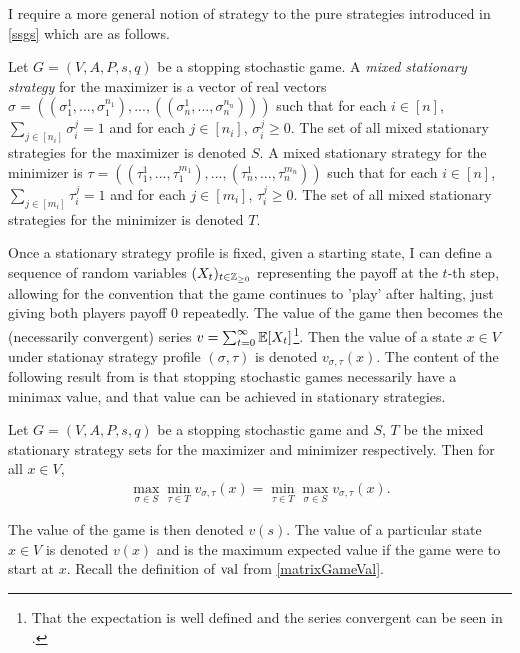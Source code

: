 I require a more general notion of strategy to the pure strategies introduced in \cref{ssgs} which
are as follows.
\begin{definition}
  Let $G = (V, A, P, s, q)$ be a stopping stochastic game. A \emph{mixed stationary strategy}
  for the maximizer is a vector of real vectors 
  $\sigma = ((\sigma_1^{1}, ..., \sigma_1^{n_1}), ..., ((\sigma_n^{1}, ..., \sigma_n^{n_n})))$ such
  that for each $i \in [n]$, $\sum_{j \in [n_i]} \sigma_i^j = 1$ and for each $j \in [n_i]$, $\sigma_i^j \geq 0$.
  The set of all mixed stationary strategies for the maximizer is denoted $S$.
  A mixed stationary strategy for the minimizer is 
  $\tau = ((\tau_1^{1}, ..., \tau_1^{m_1}), ..., (\tau_n^{1}, ..., \tau_n^{m_n}))$
  such that for each $i \in [n]$, $\sum_{j \in [m_i]} \tau_i^j = 1$ 
  and for each $j \in [m_i]$, $\tau_i^j \geq 0$.
  The set of all mixed stationary strategies for the minimizer is denoted $T$.
\end{definition}
Once a stationary strategy profile is fixed, given a starting state, 
I can define a sequence of random variables
$(X_t)_{t \in \mathbb{Z}_{\geq 0}}$ representing the payoff at the $t$-th step, allowing for the convention
that the game continues to 'play' after halting, just giving both players payoff 0 repeatedly. The value of the game
then becomes the (necessarily convergent) series $v = \sum_{t = 0}^\infty \mathbb{E}[X_t]$\footnote{
  That the expectation is well defined and the series convergent can be seen in \citep[Chapter 2]{compMdps}.}. Then the value of a state $x \in V$ 
under stationay strategy profile $(\sigma, \tau)$ is denoted $v_{\sigma, \tau}(x)$. The content of the following
result from \citep{shapley} is that stopping stochastic games necessarily have a minimax value, and that value can be achieved
in stationary strategies.
\begin{prop}
  Let $G = (V, A, P, s, q)$ be a stopping stochastic game and $S$, $T$ be the mixed stationary strategy
  sets for the maximizer and minimizer respectively. Then for all $x \in V$, 
  \begin{align*}
    \max_{\sigma \in S} \min_{\tau \in T} v_{\sigma, \tau}(x) = \min_{\tau \in T} \max_{\sigma \in S} v_{\sigma, \tau}(x).
  \end{align*}
\end{prop}
The value of the game is then denoted $v(s)$. The value of a particular state $x \in V$ is denoted $v(x)$
and is the maximum expected value if the game were to start at $x$.
Recall the definition of $\mathrm{val}$ from \cref{matrixGameVal}.
